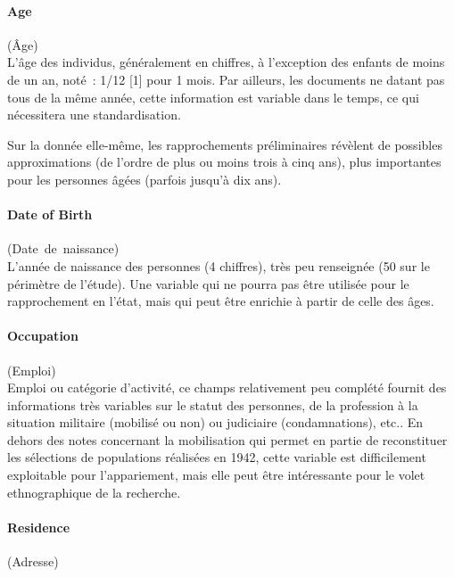 \documentclass[a4paper,12pt,twoside]{book}
\begin{document}
                \paragraph{Age}\mbox{(Âge)} \\
                
                L'âge des individus, généralement en chiffres, à l'exception des enfants de moins de un an, noté~: \og{}1/12 [1]\fg{} pour 1 mois. Par ailleurs, les documents ne datant pas tous de la même année, cette information est variable dans le temps, ce qui nécessitera une standardisation.
                
                Sur la donnée elle-même, les rapprochements préliminaires révèlent de possibles approximations (de l'ordre de plus ou moins trois à cinq ans), plus importantes pour les personnes âgées (parfois jusqu'à dix ans).
                
                \paragraph{Date of Birth}\mbox{(Date de naissance)} \\
                \label{age_desc}
                L'année de naissance des personnes (4 chiffres), très peu renseignée (50 sur le périmètre de l'étude). Une variable qui ne pourra pas être utilisée pour le rapprochement en l'état, mais qui peut être enrichie à partir de celle des âges.
                
                \paragraph{Occupation}\mbox{(Emploi)} \\
                
                Emploi ou catégorie d'activité, ce champs relativement peu complété fournit des informations très variables sur le statut des personnes, de la profession à la situation militaire (mobilisé ou non) ou judiciaire (condamnations), etc.. En dehors des notes concernant la mobilisation qui permet en partie de reconstituer les sélections de populations réalisées en 1942, cette variable est difficilement exploitable pour l'appariement, mais elle peut être intéressante pour le volet ethnographique de la recherche.

                \paragraph{Residence}\mbox{(Adresse)} \\
                
\end{document}
